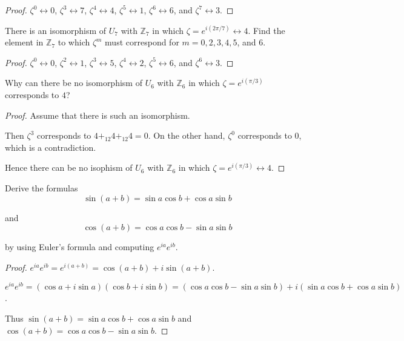 \begin{proof}
    $\zeta^{0} \leftrightarrow 0$, $\zeta^{3} \leftrightarrow 7$, $\zeta^{4} \leftrightarrow 4$, $\zeta^{5}\leftrightarrow 1$, $\zeta^{6}\leftrightarrow 6$, and $\zeta^{7}\leftrightarrow 3$.
\end{proof}

\begin{exercise}
    There is an isomorphism of $U_{7}$ with $\mathbb{Z}_{7}$ in which $\zeta = e^{i(2\pi/7)}\leftrightarrow 4$. Find the element in $\mathbb{Z}_{7}$ to which $\zeta^{m}$ must correspond for $m = 0, 2, 3, 4, 5$, and $6$.
\end{exercise}

\begin{proof}
    $\zeta^{0} \leftrightarrow 0$, $\zeta^{2} \leftrightarrow 1$, $\zeta^{3} \leftrightarrow 5$, $\zeta^{4} \leftrightarrow 2$, $\zeta^{5} \leftrightarrow 6$, and $\zeta^{6} \leftrightarrow 3$.
\end{proof}

\begin{exercise}
    Why can there be no isomorphism of $U_{6}$ with $\mathbb{Z}_{6}$ in which $\zeta = e^{i(\pi/3)}$ corresponds to $4$?
\end{exercise}

\begin{proof}
    Assume that there is such an isomorphism.

    Then $\zeta^{3}$ corresponds to $4 {+}_{12} 4 {+}_{12} 4 = 0$. On the other hand, $\zeta^{0}$ corresponds to $0$, which is a contradiction.

    Hence there can be no isophism of $U_{6}$ with $\mathbb{Z}_{6}$ in which $\zeta = e^{i(\pi/3)}\leftrightarrow 4$.
\end{proof}

\begin{exercise}
    Derive the formulas
    \[
        \sin(a + b) = \sin a\cos b + \cos a\sin b
    \]

    and
    \[
        \cos(a + b) = \cos a\cos b - \sin a\sin b
    \]

    by using Euler's formula and computing $e^{ia}e^{ib}$.
\end{exercise}

\begin{proof}
    $e^{ia}e^{ib} = e^{i(a+b)} = \cos(a+b) + i\sin(a+b)$.

    $e^{ia}e^{ib} = (\cos a + i\sin a)(\cos b + i\sin b) = (\cos a\cos b - \sin a\sin b) + i(\sin a\cos b + \cos a\sin b)$.

    Thus $\sin(a + b) = \sin a\cos b + \cos a\sin b$ and $\cos(a + b) = \cos a\cos b - \sin a\sin b$.
\end{proof}

